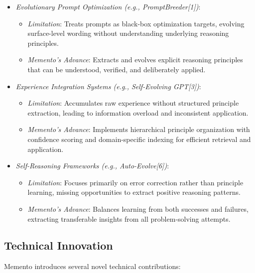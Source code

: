 \documentclass[10pt,a4paper,twocolumn]{article}
\begin{document}
\begin{itemize}
    \item \textit{Evolutionary Prompt Optimization (e.g., PromptBreeder[1])}:
    \begin{itemize}
\item \textit{Limitation}: Treats prompts as black-box optimization targets, evolving surface-level wording without understanding underlying reasoning principles.
\item \textit{Memento's Advance}: Extracts and evolves explicit reasoning principles that can be understood, verified, and deliberately applied.
\end{itemize}

    \item \textit{Experience Integration Systems (e.g., Self-Evolving GPT[3])}:
        \begin{itemize}
\item \textit{Limitation}: Accumulates raw experience without structured principle extraction, leading to information overload and inconsistent application.

\item \textit{Memento's Advance}: Implements hierarchical principle organization with confidence scoring and domain-specific indexing for efficient retrieval and application.
\end{itemize}

\item \textit{Self-Reasoning Frameworks (e.g., Auto-Evolve[6])}:
\begin{itemize}
\item \textit{Limitation}: Focuses primarily on error correction rather than principle learning, missing opportunities to extract positive reasoning patterns.
\item \textit{Memento's Advance}: Balances learning from both successes and failures, extracting transferable insights from all problem-solving attempts.
\end{itemize}

\end{itemize}
\subsection{Technical Innovation}

Memento introduces several novel technical contributions:
\end{document}
